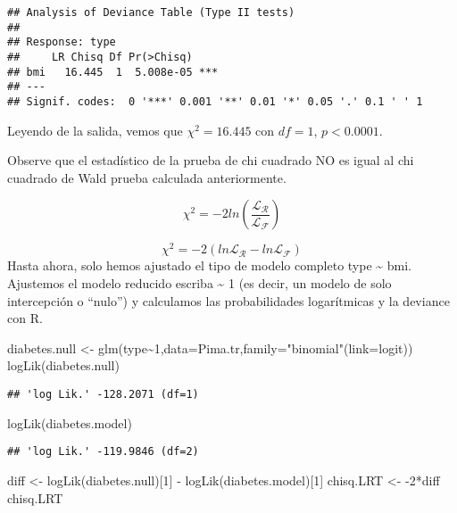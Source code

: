 \documentclass[
]{book}
\newenvironment{Shaded}{\begin{snugshade}}{\end{snugshade}}
\newcommand{\AttributeTok}[1]{\textcolor[rgb]{0.77,0.63,0.00}{#1}}
\newcommand{\DecValTok}[1]{\textcolor[rgb]{0.00,0.00,0.81}{#1}}
\newcommand{\FunctionTok}[1]{\textcolor[rgb]{0.00,0.00,0.00}{#1}}
\newcommand{\NormalTok}[1]{#1}
\newcommand{\OtherTok}[1]{\textcolor[rgb]{0.56,0.35,0.01}{#1}}
\newcommand{\SpecialCharTok}[1]{\textcolor[rgb]{0.00,0.00,0.00}{#1}}
\newcommand{\StringTok}[1]{\textcolor[rgb]{0.31,0.60,0.02}{#1}}
\begin{document}
\begin{verbatim}
## Analysis of Deviance Table (Type II tests)
## 
## Response: type
##     LR Chisq Df Pr(>Chisq)    
## bmi   16.445  1  5.008e-05 ***
## ---
## Signif. codes:  0 '***' 0.001 '**' 0.01 '*' 0.05 '.' 0.1 ' ' 1
\end{verbatim}

Leyendo de la salida, vemos que \(\chi^2=16.445\) con \(df=1\), \(p< 0.0001\).

Observe que el estadístico de la prueba de chi cuadrado NO es igual al chi cuadrado de Wald prueba calculada anteriormente.

\[\chi^2=-2ln\left(\frac{\mathcal{L_R}}{\mathcal{L_F}}\right) \]

\[\chi^2=-2\left(ln\mathcal{L_R}-ln\mathcal{L_F}\right) \]
Hasta ahora, solo hemos ajustado el tipo de modelo completo type \textasciitilde{} bmi. Ajustemos el modelo reducido
escriba \textasciitilde{} 1 (es decir, un modelo de solo intercepción o ``nulo'') y calculamos las probabilidades logarítmicas y la deviance con R.

\begin{Shaded}
\begin{Highlighting}[]
\NormalTok{diabetes.null }\OtherTok{\textless{}{-}} \FunctionTok{glm}\NormalTok{(type}\SpecialCharTok{\textasciitilde{}}\DecValTok{1}\NormalTok{,}\AttributeTok{data=}\NormalTok{Pima.tr,}\AttributeTok{family=}\StringTok{"binomial"}\NormalTok{(}\AttributeTok{link=}\NormalTok{logit))}
\FunctionTok{logLik}\NormalTok{(diabetes.null)}
\end{Highlighting}
\end{Shaded}

\begin{verbatim}
## 'log Lik.' -128.2071 (df=1)
\end{verbatim}

\begin{Shaded}
\begin{Highlighting}[]
\FunctionTok{logLik}\NormalTok{(diabetes.model)}
\end{Highlighting}
\end{Shaded}

\begin{verbatim}
## 'log Lik.' -119.9846 (df=2)
\end{verbatim}

\begin{Shaded}
\begin{Highlighting}[]
\NormalTok{diff }\OtherTok{\textless{}{-}} \FunctionTok{logLik}\NormalTok{(diabetes.null)[}\DecValTok{1}\NormalTok{] }\SpecialCharTok{{-}} \FunctionTok{logLik}\NormalTok{(diabetes.model)[}\DecValTok{1}\NormalTok{]}
\NormalTok{chisq.LRT }\OtherTok{\textless{}{-}} \SpecialCharTok{{-}}\DecValTok{2}\SpecialCharTok{*}\NormalTok{diff}
\NormalTok{chisq.LRT}
\end{Highlighting}
\end{Shaded}
\end{document}
